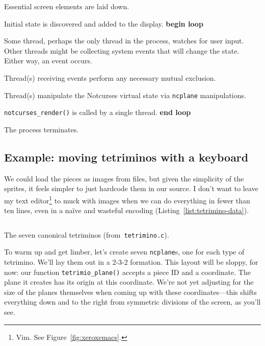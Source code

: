 \begin{denseitemize}
\item{Essential screen elements are laid down.}
\item{Initial state is discovered and added to the display.}
\textbf{begin loop} 
\item{Some thread, perhaps the only thread in the process, watches
    for user input. Other threads might be collecting system events that will
    change the state. Either way, an event occurs.}
\item{Thread(s) receiving events perform any necessary mutual exclusion.}
\item{Thread(s) manipulate the Notcurses virtual state via \texttt{ncplane} manipulations.}
\item{\texttt{notcurses\_render()} is called by a single thread.}
\textbf{end loop}
\item{The process terminates.}
\end{denseitemize}

\subsection{Example: moving tetriminos with a keyboard}

We could load the pieces as images from files, but given the simplicity of the
sprites, it feels simpler to just hardcode them in our source. I don't want to
leave my text editor\footnote{Vim. See Figure~\ref{fig:xeroxemacs}.} to muck
with images when we can do everything in fewer than ten lines, even in a naïve
and wasteful encoding (Listing~\ref{list:tetrimino-data}).

\begin{listing}[!htbp]
\inputminted[]{C}{code/tetrimino-data.h}
\caption{The seven canonical tetriminos (from~\texttt{tetrimino.c}).}
\label{list:tetrimino-data}
\end{listing}

To warm up and get limber, let's create seven \texttt{ncplane}s, one for each type
of tetrimino. We'll lay them out in a 2-3-2 formation. This layout will be
sloppy, for now: our function
\texttt{tetrimio\_plane()} accepts a piece ID and a coordinate.
The plane it creates has its origin at this coordinate.
We're not yet adjusting for the size of the planes themselves when coming
up with these coordinates---this shifts everything down and to the right from
symmetric divisions of the screen, as you'll see.

